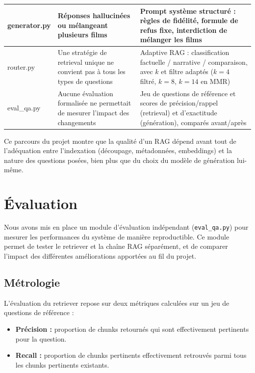 \documentclass[11pt]{report}
\begin{document}
\begin{xltabular}{\textwidth}{|l|X|X|}
        \hline
        generator.py & Réponses hallucinées ou mélangeant plusieurs films & Prompt système structuré : règles de fidélité, formule de refus fixe, interdiction de mélanger les films \\
        \hline
        router.py & Une stratégie de retrieval unique ne convient pas à tous les types de questions & Adaptive RAG : classification factuelle / narrative / comparaison, avec $k$ et filtre adaptés ($k=4$ filtré, $k=8$, $k=14$ en MMR) \\
        \hline
        eval\_qa.py & Aucune évaluation formalisée ne permettait de mesurer l'impact des changements & Jeu de questions de référence et scores de précision/rappel (retrieval) et d'exactitude (génération), comparés avant/après \\

    \end{xltabular}

    Ce parcours du projet montre que la qualité d'un RAG dépend avant tout de l'adéquation entre l'indexation (découpage, métadonnées, embeddings) et la nature des questions posées, bien plus que du choix du modèle de génération lui-même.

    \chapter{Évaluation}
    \label{sec:eval}

    Nous avons mis en place un module d'évaluation indépendant (\texttt{eval\_qa.py}) pour mesurer les performances du système de manière reproductible. Ce module permet de tester le retriever et la chaîne RAG séparément, et de comparer l'impact des différentes améliorations apportées au fil du projet.

    \section{Métrologie}

    L'évaluation du retriever repose sur deux métriques calculées sur un jeu de questions de référence :
    \begin{itemize}
        \item \textbf{Précision :} proportion de chunks retournés qui sont effectivement pertinents pour la question.
        \item \textbf{Recall :} proportion de chunks pertinents effectivement retrouvés parmi tous les chunks pertinents existants.
    \end{itemize}
\end{document}
